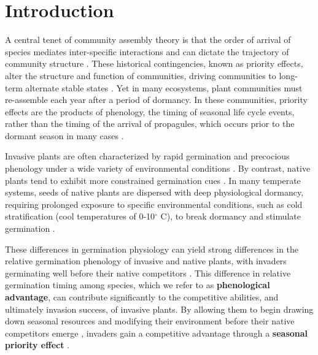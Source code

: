 \documentclass{article}[11pt]
\begin{document}
\section*{Introduction}
 A central tenet of community assembly theory is that the order of arrival of species mediates inter-specific interactions and can dictate the trajectory of community structure \citep{Fukami2015}. These historical contingencies, known as priority effects, alter the structure and function of communities, driving communities to long-term alternate stable states \citep{Fukami2011}. Yet in many ecosystems, plant communities must re-assemble each year after a period of dormancy. In these communities, priority effects are the products of phenology, the timing of seasonal life cycle events, %
rather than the timing of the arrival of propagules, which occurs prior to the dormant season in many cases \citep{Rudolf:2019aa,Howe:1982aa,Baskin:1988aa}. 

Invasive plants are often characterized by rapid germination and precocious phenology under a wide variety of environmental conditions \citep{Gioria2018,Gioria:2017wo,Wolkovich:2011uh,Smith:2013uj}. By contrast, native plants tend to exhibit more constrained germination cues \citep{Marushia:2010ug,Wainwright:2013tv,Van-Clef:2001to}. In many temperate systems, seeds of native plants are dispersed with deep physiological dormancy, requiring prolonged exposure to specific environmental conditions, such as cold stratification (cool temperatures of 0-10$^{\circ}$ C), to break dormancy and stimulate germination \citep{Brink:2013wr,Cavieres:2017aa,Bradford:2007tj}.

These differences in germination physiology can yield strong differences in the relative germination phenology of invasive and native plants, with invaders germinating well before their native competitors \citep{Gioria:2017wo}. This difference in relative germination timing among species, which we refer to as \textbf{phenological advantage}, can contribute significantly to the competitive abilities, and ultimately invasion success, of invasive plants. By allowing them to begin drawing down seasonal resources and modifying their environment before their native competitors emerge \citep{Kardol2013}, invaders gain a competitive advantage through a \textbf{seasonal priority effect} \citep{Wainwright_2011}.
\end{document}
